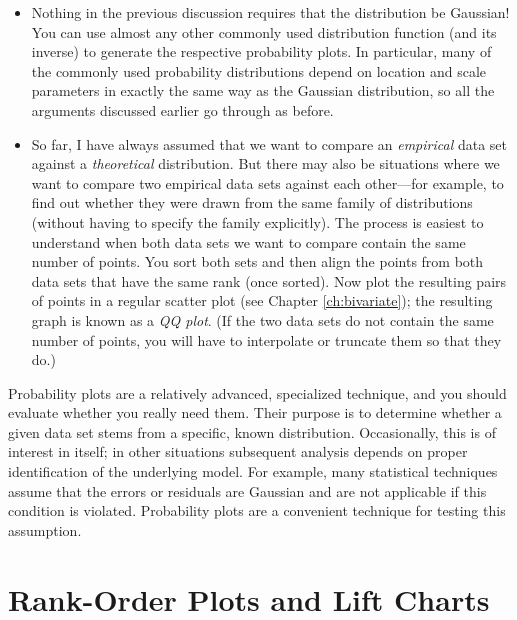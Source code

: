 \begin{itemize}
\item Nothing in the previous discussion requires that the
  distribution be Gaussian! You can use almost any other commonly used
  distribution function (and its inverse) to generate the respective
  probability plots. In particular, many of the commonly used\vadjust{\vfill\pagebreak}
  probability distributions depend on location and scale parameters in
  exactly the same way as the Gaussian distribution, so all the
  arguments discussed earlier go through as before.
\item So far, I have always assumed that we want to compare an
  \emph{empirical} data set against a \emph{theoretical} distribution.
  But there may also be situations where we want to compare two
  empirical data sets against each other---for example, to find out
  whether they were drawn from the same family of distributions
  (without having to specify the family explicitly). The process is
  easiest to understand when both data sets we want to compare contain
  the same number of points. You sort both sets and then align the
  points from both data sets that have the same rank (once sorted).
  Now plot the resulting pairs of points in a regular scatter plot
  (see Chapter \ref{ch:bivariate}); the resulting graph is known as a
  \emph{QQ plot}. (If the two data sets do not contain the same number
  of points, you will have to interpolate or truncate them so that
  they do.)
\end{itemize}

Probability plots are a relatively advanced, specialized technique,
and you should evaluate whether you really need them. Their purpose is
to determine whether a given data set stems from a specific, known
distribution. Occasionally, this is of interest in itself; in other
situations subsequent analysis depends on proper identification of the
underlying model. For example, many statistical techniques assume that
the errors or residuals are Gaussian and are not applicable if this
condition is violated.  Probability plots are a convenient technique
for testing this assumption.
\vfill\pagebreak

\section{Rank-Order Plots and Lift Charts}

